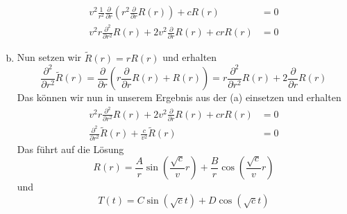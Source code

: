 \documentclass{article}
\theoremstyle{definition}
\begin{document}
\begin{enumerate}[(a)]
\begin{align*}
        v^2\frac{1}{r^2}\frac{\partial}{\partial r}\left(r^2\frac{\partial}{\partial r}R(r)\right) + cR(r) &= 0\\
        v^2r\frac{\partial^2}{\partial r^2}R(r) + 2v^2\frac{\partial}{\partial r}R(r) + crR(r) &= 0
    \end{align*}
    \item Nun setzen wir $\tilde{R}(r) = rR(r)$ und erhalten
    $$\frac{\partial^2}{\partial r^2} \tilde{R}(r) = \frac{\partial}{\partial r}\left(r \frac{\partial}{\partial r}R(r) + R(r)\right) = r \frac{\partial^2}{\partial r^2} R(r) + 2 \frac{\partial}{\partial r}R(r)$$
    Das können wir nun in unserem Ergebnis aus der (a) einsetzen und erhalten
    \begin{align*}
        v^2r\frac{\partial^2}{\partial r^2}R(r) + 2v^2\frac{\partial}{\partial r}R(r) + crR(r) &= 0\\
        \frac{\partial^2}{\partial r^2} \tilde{R}(r) + \frac{c}{v^2}\tilde{R}(r) &= 0
    \end{align*}
    Das führt auf die Lösung
    $$R(r) = \frac{A}{r}\sin(\frac{\sqrt{c}}{v} r) + \frac{B}{r}\cos(\frac{\sqrt{c}}{v} r)$$ und $$T(t) = C \sin(\sqrt{c} t) + D \cos(\sqrt{c} t)$$
\end{enumerate}
\end{document}
